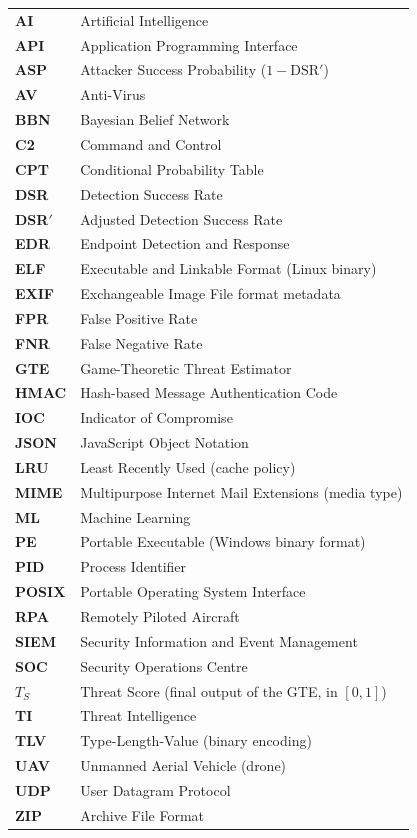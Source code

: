 \documentclass[12pt, a4paper]{report}
\begin{document}
\begin{tabular}{ll}
    \textbf{AI} & Artificial Intelligence \\
    \textbf{API} & Application Programming Interface \\
    \textbf{ASP} & Attacker Success Probability ($1 - \mathrm{DSR}'$) \\
    \textbf{AV} & Anti-Virus \\
    \textbf{BBN} & Bayesian Belief Network \\
    \textbf{C2} & Command and Control \\
    \textbf{CPT} & Conditional Probability Table \\
    \textbf{DSR} & Detection Success Rate \\
    \textbf{DSR$'$} & Adjusted Detection Success Rate \\
    \textbf{EDR} & Endpoint Detection and Response \\
    \textbf{ELF} & Executable and Linkable Format (Linux binary) \\
    \textbf{EXIF} & Exchangeable Image File format metadata \\
    \textbf{FPR} & False Positive Rate \\
    \textbf{FNR} & False Negative Rate \\
    \textbf{GTE} & Game-Theoretic Threat Estimator \\
    \textbf{HMAC} & Hash-based Message Authentication Code \\
    \textbf{IOC} & Indicator of Compromise \\
    \textbf{JSON} & JavaScript Object Notation \\
    \textbf{LRU} & Least Recently Used (cache policy) \\
    \textbf{MIME} & Multipurpose Internet Mail Extensions (media type) \\
    \textbf{ML} & Machine Learning \\
    \textbf{PE} & Portable Executable (Windows binary format) \\
    \textbf{PID} & Process Identifier \\
    \textbf{POSIX} & Portable Operating System Interface \\
    \textbf{RPA} & Remotely Piloted Aircraft \\
    \textbf{SIEM} & Security Information and Event Management \\
    \textbf{SOC} & Security Operations Centre \\
    $T_S$ & Threat Score (final output of the GTE, in $[0,1]$) \\
    \textbf{TI} & Threat Intelligence \\
    \textbf{TLV} & Type-Length-Value (binary encoding) \\
    \textbf{UAV} & Unmanned Aerial Vehicle (drone) \\
    \textbf{UDP} & User Datagram Protocol \\
    \textbf{ZIP} & Archive File Format \\
\end{tabular}
\end{document}

